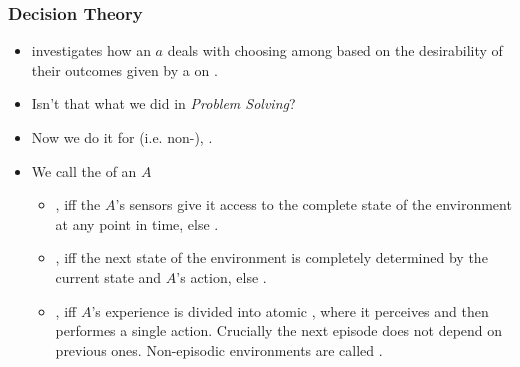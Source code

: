 \documentclass[notes,mh]{mikoslides}
\begin{document}
\begin{module}[id=decision-theory]

\begin{frame}
  \frametitle{Decision Theory}
  \begin{itemize}
  \item 
    \begin{definition}
       investigates how an  $a$ deals with
      choosing among  based on the desirability of their
      outcomes given by a  on .
    \end{definition}
  \item 
    \begin{omtext}[title=Wait] 
      Isn't that what we did in  \emph{Problem Solving}?
    \end{omtext}
  \item 
    \begin{omtext}[title={Yes, but}]
      Now we do it for 
      (i.e. non-), 
      .
    \end{omtext}
  \item
    \begin{omtext}[title=Recall]
      We call the  of an  $A$
      \begin{itemize}
      \item {}, iff the $A$'s sensors give it access to
        the complete state of the environment at any point in time, else
        .
      \item {}, iff the next state of the environment is
        completely determined by the current state and $A$'s action, else
        .
      \item {}, iff $A$'s experience is divided into atomic
        , where it perceives and then performes a single
        action. Crucially the next episode does not depend on previous ones. Non-episodic
        environments are called .
      \end{itemize}

\end{omtext}
\end{itemize}
\end{frame}
\end{module}
\end{document}
